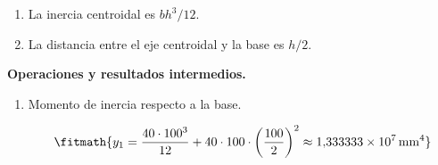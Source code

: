\begin{enumerate}

\item La inercia centroidal es $bh^3/12$.

\item La distancia entre el eje centroidal y la base es $h/2$.

\end{enumerate}

\noindent\textbf{Operaciones y resultados intermedios.}

\begin{enumerate}

\item Momento de inercia respecto a la base.

\[\fitmath{y_{1}=\frac{40\cdot {100}^{3}}{12}+40\cdot 100\cdot {\left(\frac{100}{2}\right)}^{2}\approx 1{,}333333\times10^{7}\,\mathrm{mm^{4}}}\]

\end{enumerate}
